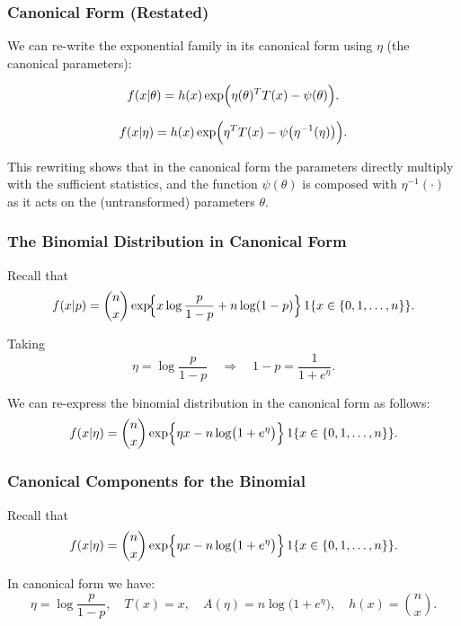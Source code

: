 \documentclass{beamer}
\begin{document}
\begin{frame}
\frametitle{Canonical Form (Restated)}

We can re-write the exponential family in its canonical form using $\eta$ (the canonical parameters):

\[
f(x|\theta) = h(x)\exp\Bigl(\eta(\theta)^T T(x) - \psi(\theta)\Bigr).
\]

\[
f(x|\eta) = h(x)\exp\Bigl(\eta^T T(x) - \psi\bigl(\eta^{-1}(\eta)\bigr)\Bigr).
\]


This rewriting shows that in the canonical form the parameters directly multiply with the sufficient statistics, and the function $\psi(\theta)$ is composed with $\eta^{-1}(\cdot)$ as it acts on the (untransformed) parameters $\theta$.
\end{frame}

\begin{frame}
\frametitle{The Binomial Distribution in Canonical Form}
Recall that
\[
f(x|p) = \binom{n}{x}\exp\!\Bigl\{x\log\frac{p}{1-p}+n\log(1-p)\Bigr\}\, 1\{x \in \{0,1,\dots,n\}\}.
\]

Taking 
\[
\eta = \log\frac{p}{1-p} \quad \Longrightarrow \quad 1-p = \frac{1}{1+e^\eta}.
\]

We can re-express the binomial distribution in the canonical form as follows:
\[
f(x|\eta) = \binom{n}{x}\exp\Bigl\{\eta x - n\log\bigl(1+e^\eta\bigr)\Bigr\}\, 1\{x \in \{0,1,\dots,n\}\}.
\]
\end{frame}

\begin{frame}
\frametitle{Canonical Components for the Binomial}

Recall that 
\[
f(x|\eta) = \binom{n}{x}\exp\Bigl\{\eta x - n\log\bigl(1+e^\eta\bigr)\Bigr\}\, 1\{x \in \{0,1,\dots,n\}\}.
\]

In canonical form we have:
\[
\eta = \log\frac{p}{1-p}, \quad T(x)=x,\quad A(\eta)= n\log\bigl(1+e^\eta\bigr),\quad h(x)= \binom{n}{x}.
\]
\end{frame}
\end{document}
